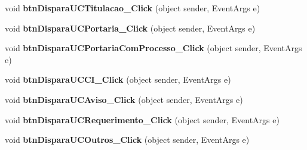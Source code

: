 \begin{DoxyCompactItemize}
\item 
\hypertarget{class_sistema_r_h_1_1_alterar_colaborador_aeabd19cd503c79bc4a791128dfdaf37a}{
void {\bfseries btnDisparaUCTitulacao\_\-Click} (object sender, EventArgs e)}
\label{class_sistema_r_h_1_1_alterar_colaborador_aeabd19cd503c79bc4a791128dfdaf37a}

\item 
\hypertarget{class_sistema_r_h_1_1_alterar_colaborador_a47533e13e5cc394c67cfe68fb48282cf}{
void {\bfseries btnDisparaUCPortaria\_\-Click} (object sender, EventArgs e)}
\label{class_sistema_r_h_1_1_alterar_colaborador_a47533e13e5cc394c67cfe68fb48282cf}

\item 
\hypertarget{class_sistema_r_h_1_1_alterar_colaborador_a270362a23770e6d5710ed25c95d9fd64}{
void {\bfseries btnDisparaUCPortariaComProcesso\_\-Click} (object sender, EventArgs e)}
\label{class_sistema_r_h_1_1_alterar_colaborador_a270362a23770e6d5710ed25c95d9fd64}

\item 
\hypertarget{class_sistema_r_h_1_1_alterar_colaborador_a2bbaaacab2de64dff092f8888ad3683b}{
void {\bfseries btnDisparaUCCI\_\-Click} (object sender, EventArgs e)}
\label{class_sistema_r_h_1_1_alterar_colaborador_a2bbaaacab2de64dff092f8888ad3683b}

\item 
\hypertarget{class_sistema_r_h_1_1_alterar_colaborador_a465f56a58ebef04ba085fbf88821427f}{
void {\bfseries btnDisparaUCAviso\_\-Click} (object sender, EventArgs e)}
\label{class_sistema_r_h_1_1_alterar_colaborador_a465f56a58ebef04ba085fbf88821427f}

\item 
\hypertarget{class_sistema_r_h_1_1_alterar_colaborador_ab99d25a4f3ec521d43154db667a02eda}{
void {\bfseries btnDisparaUCRequerimento\_\-Click} (object sender, EventArgs e)}
\label{class_sistema_r_h_1_1_alterar_colaborador_ab99d25a4f3ec521d43154db667a02eda}

\item 
\hypertarget{class_sistema_r_h_1_1_alterar_colaborador_aa922a19b6450dd64646441483646f1ee}{
void {\bfseries btnDisparaUCOutros\_\-Click} (object sender, EventArgs e)}
\label{class_sistema_r_h_1_1_alterar_colaborador_aa922a19b6450dd64646441483646f1ee}


\end{DoxyCompactItemize}
